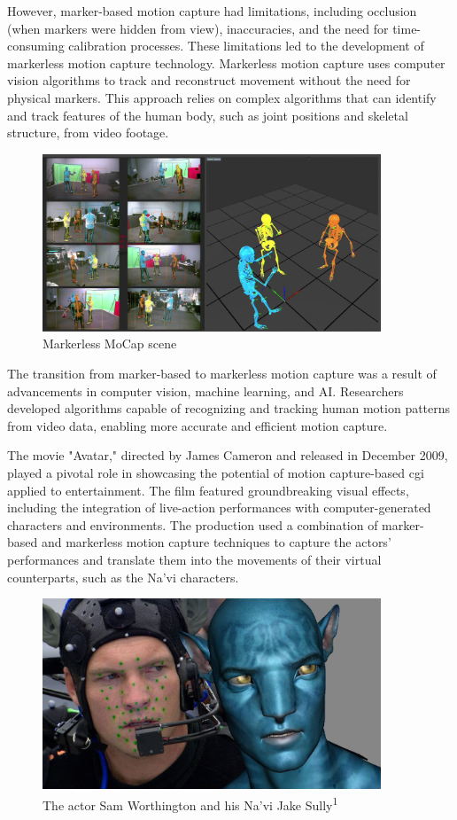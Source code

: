 However, marker-based motion capture had limitations, including occlusion 
(when markers were hidden from view), inaccuracies, and the need for time-consuming calibration processes. 
These limitations led to the development of markerless motion capture technology. 
Markerless motion capture uses computer vision algorithms to track and reconstruct movement without the need for physical markers. 
This approach relies on complex algorithms that can identify and track features of the human body, 
such as joint positions and skeletal structure, from video footage.
\begin{figure}[H]
    \centering
    \includegraphics[width=0.9\textwidth]{graphics/MoCapMarkerlessQualisys.png}
    \caption{Markerless MoCap scene}
    \label{fig:mocap}
\end{figure}

The transition from marker-based to markerless motion capture was a result of advancements in computer vision, machine learning, and AI. 
Researchers developed algorithms capable of recognizing and tracking human motion patterns from video data, 
enabling more accurate and efficient motion capture.

The movie "Avatar," directed by James Cameron and released in December 2009, 
played a pivotal role in showcasing the potential of motion capture-based cgi applied to entertainment. 
The film featured groundbreaking visual effects, 
including the integration of live-action performances with computer-generated characters and environments. 
The production used a combination of marker-based and markerless motion capture techniques to capture the actors' 
performances and translate them into the movements of their virtual counterparts, such as the Na'vi characters.
\begin{figure}[H]
    \centering
    \includegraphics[width=0.9\textwidth]{graphics/avatar_markers.jpg}
    \caption[]{The actor Sam Worthington and his Na'vi Jake Sully\textsuperscript{1}}
    \label{fig:avatar}
\end{figure}

